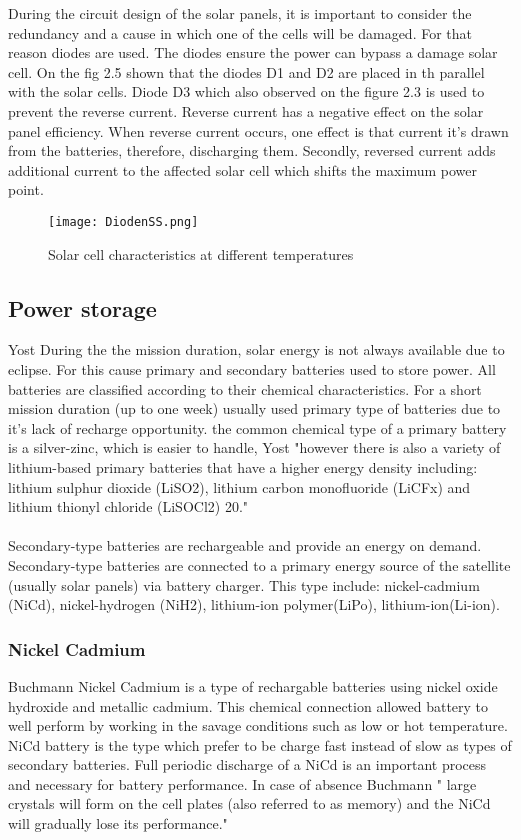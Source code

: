 During the circuit design of the solar panels, it is important to consider the redundancy and a cause in which one of the cells will be damaged. For that reason diodes are used. The diodes ensure the power can bypass a damage solar cell. On the fig 2.5 shown that the diodes D1 and D2 are placed in th parallel with the solar cells. Diode D3 which also observed on the figure 2.3 is used to prevent the reverse current. Reverse current has a negative effect on the solar panel efficiency. When reverse current occurs, one effect is that current it's drawn from the batteries, therefore, discharging them. Secondly, reversed current adds additional current to the affected solar cell which shifts the maximum power point.\\


\begin{figure}[h]
	\centering
	\texttt{[image: DiodenSS.png]}
	\caption{ Solar cell characteristics at different temperatures}
	\label{fig: EPS}
\end{figure}
 
\newpage


\subsection{Power storage \label{sec:tech1}}



Yost\cite{1} During the the mission duration, solar energy is not always available due to eclipse. For this cause primary and secondary batteries used to store power. All batteries are classified according to their chemical characteristics. For a short mission duration (up to one week) usually used primary type of batteries due to it's lack of recharge opportunity. the common chemical type of a primary battery is a silver-zinc, which is easier to handle, Yost\cite{1} "however there is also a variety of lithium-based primary batteries that have a higher energy density including: lithium sulphur dioxide (LiSO2), lithium carbon monofluoride (LiCFx) and lithium thionyl chloride (LiSOCl2) 20."\\
\\
Secondary-type batteries are rechargeable and provide an energy on demand. Secondary-type batteries are connected to a primary energy source of the satellite (usually solar panels) via battery charger. This type include: nickel-cadmium (NiCd), nickel-hydrogen (NiH2), lithium-ion polymer(LiPo), lithium-ion(Li-ion).
\subsubsection{Nickel Cadmium \label{sec:tech}}
 Buchmann\cite{7} Nickel Cadmium is a type of rechargable batteries using nickel oxide hydroxide and metallic cadmium. This chemical connection allowed battery to well perform by working in the savage conditions such as low or hot temperature. NiCd battery is the type which prefer to be charge fast instead of slow as types of secondary batteries. Full periodic discharge of a NiCd is an important process and necessary for battery performance. In case of absence  Buchmann\cite{7} " large crystals will form on the cell plates (also referred to as memory) and the NiCd will gradually lose its performance."
 
